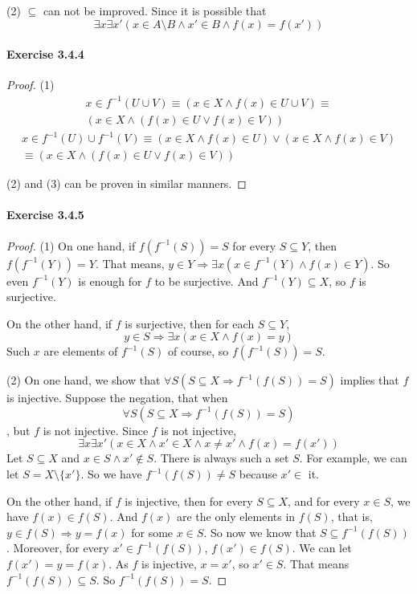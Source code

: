 (2) $\subseteq$ can not be improved. Since it is possible that
\[
\exists x \exists x'(x \in A \setminus B \wedge x' \in B \wedge f(x) = f(x'))
\]

\paragraph{Exercise 3.4.4} \label{exercise3.4.4}
\begin{proof}
(1) 
\begin{align*}
x \in f^{-1}(U \cup V) \equiv (x \in X \wedge f(x) \in U \cup V) \equiv \\
(x \in X \wedge (f(x) \in U \vee f(x) \in V))
\end{align*}
\begin{align*}
x \in  f^{-1}(U) \cup  f^{-1}(V) \equiv (x \in X \wedge f(x) \in U) \vee (x \in X \wedge f(x) \in V) \\
\equiv (x \in X \wedge (f(x) \in U \vee f(x) \in V))
\end{align*}

(2) and (3) can be proven in similar manners. 
\end{proof}

\paragraph{Exercise 3.4.5} \label{exercise3.4.5}
\begin{proof}
(1) On one hand, if $f(f^{-1}(S)) = S$ for every $S \subseteq Y$, then \\
$f(f^{-1}(Y)) = Y$. That means, 
$y \in Y \Longrightarrow \exists x (x \in f^{-1}(Y) \wedge f(x) \in Y)$. So even $f^{-1}(Y)$ 
is enough for $f$ to be surjective. And $f^{-1}(Y) \subseteq X$, so $f$ is surjective.

On the other hand, if $f$ is surjective, then for each $S \subseteq Y$, 
\[
y \in S \Longrightarrow \exists x(x \in X \wedge f(x) = y)
\]
Such $x$ are elements of $f^{-1}(S)$ of course, so $f(f^{-1}(S)) = S$.

(2) On one hand, we show that $\forall S(S \subseteq X \Longrightarrow f^{-1}(f(S)) = S)$ implies that 
$f$ is injective. Suppose the negation, that when 
\[
\forall S(S \subseteq X \Longrightarrow f^{-1}(f(S)) = S)
\], but $f$ is not injective. Since $f$ is not injective, 
\[
\exists x \exists x'(x \in X \wedge x' \in X \wedge x \neq x' \wedge f(x) = f(x'))
\]
Let $S \subseteq X$ and $x \in S \wedge x' \notin S$. There is always such a set $S$.
For example, we can let $S = X\setminus \{x'\}$. So we have $f^{-1}(f(S)) \neq S$ because $x' \in$ it.

On the other hand, if $f$ is injective, then for every $S \subseteq X$, and for every $x \in S$, we have 
$f(x) \in f(S)$. And $f(x)$ are the only elements in $f(S)$, that is, 
$y \in f(S) \Longrightarrow y = f(x)$ for some $x \in S$. So now we know that 
$S \subseteq f^{-1}(f(S))$. Moreover, for every $x' \in f^{-1}(f(S))$, $f(x') \in f(S)$. We can let 
$f(x') = y = f(x)$. As $f$ is injective, $x = x'$, so $x' \in S$. That means $f^{-1}(f(S)) \subseteq S$. 
So $f^{-1}(f(S)) =  S$.
\end{proof}


